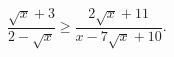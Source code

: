\begin{ex}[type=inequality]
	\begin{condition}
		 $\dfrac{\sqrt{x}+  3}{2 - \sqrt{x}}\geqslant\dfrac{2\sqrt{x}+11}{x - 7\sqrt{x} + 10}.$
	\end{condition}
\end{ex}